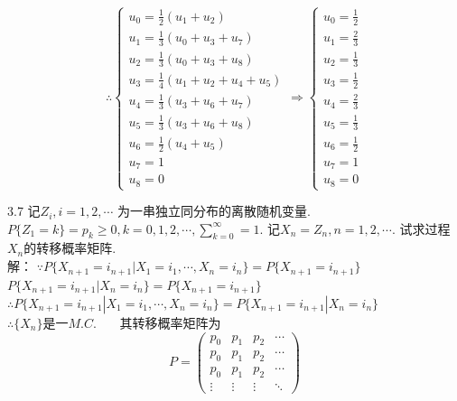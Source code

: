 \[
\therefore
\begin{cases}
u_0 = \frac{1}{2}(u_1+u_2)\\
u_1 = \frac{1}{3}(u_0+u_3+u_7)\\
u_2 = \frac{1}{3}(u_0+u_3+u_8)\\
u_3 = \frac{1}{4}(u_1+u_2+u_4+u_5)\\
u_4 = \frac{1}{3}(u_3+u_6+u_7)\\
u_5 = \frac{1}{3}(u_3+u_6+u_8)\\
u_6 = \frac{1}{2}(u_4+u_5)\\
u_7 = 1\\
u_8 = 0
\end{cases}
\Rightarrow
\begin{cases}
u_0 = \frac{1}{2}\\
u_1 = \frac{2}{3}\\
u_2 = \frac{1}{3}\\
u_3 = \frac{1}{2}\\
u_4 = \frac{2}{3}\\
u_5 = \frac{1}{3}\\
u_6 = \frac{1}{2}\\
u_7 = 1\\
u_8 = 0
\end{cases}
\]


3.7 记$Z_i, i = 1, 2, \cdots$ 为一串独立同分布的离散随机变量. $P\{Z_1 = k\} = p_k \geqslant 0, k = 0,1,2,\cdots, \sum\limits^\infty_{k=0} = 1$. 记$X_n = Z_n, n = 1, 2, \cdots$. 试求过程$X_n$的转移概率矩阵.\\
解：
$\because P\{X_{n+1} = i_{n+1} | X_1 = i_1, \cdots , X_n = i_n\} = P\{X_{n+1} = i_{n+1}\}$\\
$P\{X_{n+1} = i_{n+1} | X_n = i_n\} = P\{X_{n+1} = i_{n+1}\}$\\
$\therefore P\{X_{n+1} = i_{n+1} | X_1 = i_1, \cdots , X_n = i_n\} = P\{X_{n+1} = i_{n+1} | X_n = i_n\}$\\
$\therefore \{X_n\}$是一$M.C.$ ~~~其转移概率矩阵为
\[
P =
\begin{pmatrix}
p_0 & p_1 & p_2 & \cdots \\
p_0 & p_1 & p_2 & \cdots \\
p_0 & p_1 & p_2 & \cdots \\
\vdots & \vdots & \vdots & \ddots
\end{pmatrix}
\]


